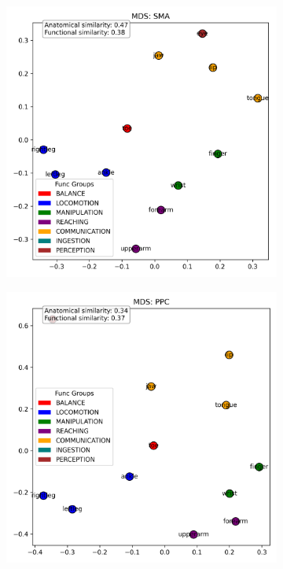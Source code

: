 \documentclass{article}
\begin{document}
\begin{figure}[!htbp]
\begin{subfigure}[b]{0.45\textwidth}
        \label{fig:mds_goal_dual}
    \end{subfigure}
    \vspace{0.5em}
    \begin{subfigure}[b]{0.45\textwidth}
        \centering
        \includegraphics[width=\textwidth]{results/goal_dual/mds_SMA_with_metrics.png}
        \label{fig:mds_task}
    \end{subfigure}
    \hfill
    \begin{subfigure}[b]{0.45\textwidth}
        \centering
        \includegraphics[width=\textwidth]{results/goal_dual/mds_PPC_with_metrics.png}

\end{subfigure}
\end{figure}
\end{document}
